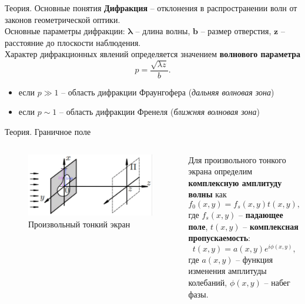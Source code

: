 \documentclass[11pt]{beamer} %
\begin{document}
    \begin{frame}{Теория. Основные понятия}
        \textbf{Дифракция} -- отклонения в распространении волн от законов геометрической оптики. \\
        Основные параметры дифракции: $\boldsymbol{\lambda}$ -- длина волны, $\boldsymbol{b}$ -- размер отверстия, $\boldsymbol{z}$ -- расстояние до плоскости наблюдения. \\
        Характер дифракционных явлений определяется значением \textbf{волнового параметра}
        \begin{equation}
            p = \frac{\sqrt{\lambda z}}{b}.
        \end{equation}
        \begin{itemize}
            \item если $p \gg 1$ -- область дифракции Фраунгофера (\textit{дальняя волновая зона})
            \item если $p \sim 1$ -- область дифракции Френеля (\textit{ближняя волновая зона})
        \end{itemize}
    \end{frame}

    \begin{frame}{Теория. Граничное поле}
        \begin{columns}
            \begin{figure}[H]
            \centering
                \includegraphics[width = \textwidth]{images/theory_boundary_field.jpg}
                \caption{Произвольный тонкий экран}
            \end{figure}

                Для произвольного тонкого экрана определим \textbf{комплексную амплитуду волны} как 
                \begin{equation}
                    f_0(x,y) = f_s(x,y)t(x,y),
                \end{equation}
                где $f_s(x,y)$ -- \textbf{падающее поле}, $t(x,y)$ -- \textbf{комплексная пропускаемость}:
                \begin{equation}
                    t(x,y) = a(x,y)e^{i\phi(x,y)},
                \end{equation}
                где $a(x,y)$ -- функция изменения амплитуды колебаний, $\phi(x,y)$ -- набег фазы.
        \end{columns}
    \end{frame}
\end{document}
